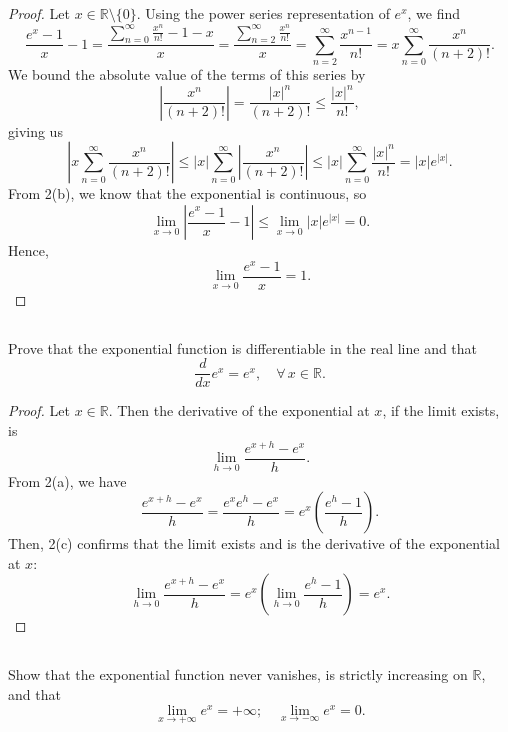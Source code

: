 \documentclass[12pt]{article}
\newenvironment{problem}
    {\begin{lrbox}{\mybox}\begin{minipage}{0.98\textwidth}}
    {\end{minipage}\end{lrbox}\begin{center}\framebox[\textwidth]{\usebox{\mybox}}\end{center}}
\theoremstyle{definition}
\newcommand{\R}{\mathbb{R}}
\begin{document}
\begin{proof}
    Let $x \in \R \setminus \{0\}$. Using the power series representation of $e^x$, we find
    \[
        \frac{e^x - 1}{x} - 1
            = \frac{\sum_{n=0}^\infty \frac{x^n}{n!} - 1 - x}{x}
            = \frac{\sum_{n=2}^\infty \frac{x^n}{n!}}{x}
            = \sum_{n=2}^\infty \frac{x^{n-1}}{n!}
            = x\sum_{n=0}^\infty \frac{x^n}{(n+2)!}.
    \]
    We bound the absolute value of the terms of this series by
    \[
        \left|\frac{x^n}{(n+2)!}\right| = \frac{|x|^n}{(n+2)!} \leq \frac{|x|^n}{n!},
    \]
    giving us
    \[
        \left|x \sum_{n=0}^\infty \frac{x^n}{(n+2)!}\right|
            \leq |x| \sum_{n=0}^\infty \left|\frac{x^n}{(n+2)!}\right|
            \leq |x| \sum_{n=0}^\infty \frac{|x|^n}{n!}
            = |x|e^{|x|}.
    \]
    From 2(b), we know that the exponential is continuous, so
    \[
        \lim_{x \to 0} \left|\frac{e^x - 1}{x} - 1\right| \leq \lim_{x \to 0} |x|e^{|x|} = 0.
    \]
    Hence,
    \[
        \lim_{x \to 0} \frac{e^x - 1}{x} = 1.
    \]
    
    
\end{proof}

\subsection{}
\begin{problem}
    Prove that the exponential function is differentiable in the real line and that 
    \begin{equation}
        \frac{d}{dx} e^x = e^x,\quad \forall\, x\in \R.
    \end{equation}
\end{problem}

\begin{proof}
    Let $x \in \R$. Then the derivative of the exponential at $x$, if the limit exists, is
    \[
        \lim_{h \to 0} \frac{e^{x + h} - e^x}{h}.
    \]
    From 2(a), we have
    \[
        \frac{e^{x + h} - e^x}{h}
            = \frac{e^x e^{h} - e^x}{h}
            = e^x \left(\frac{e^{h} - 1}{h}\right).
    \]
    Then, 2(c) confirms that the limit exists and is the derivative of the exponential at $x$:
    \[
        \lim_{h \to 0} \frac{e^{x + h} - e^x}{h}
            = e^x \left(\lim_{h \to 0} \frac{e^{h} - 1}{h} \right)
            = e^x.
    \]
    
\end{proof}

\subsection{}
\begin{problem}
    Show that the exponential function never vanishes, is strictly increasing on $\R$, and that 
    \begin{equation}
        \lim_{x\to +\infty} e^x = +\infty;\quad \lim_{x\to -\infty} e^x = 0.
    \end{equation}
\end{problem}
\end{document}
